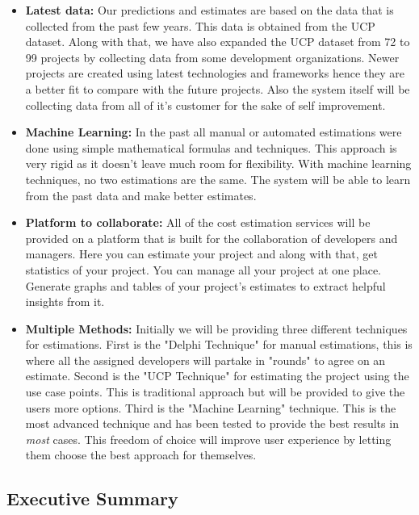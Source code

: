 \begin{itemize}
	\item {\bfseries Latest data:} Our predictions and estimates are based on the data that is collected from the past few years. This data is obtained from the UCP dataset. Along with that, we have also expanded the UCP dataset from 72 to 99 projects by collecting data from some development organizations. Newer projects are created using latest technologies and frameworks hence they are a better fit to compare with the future projects. Also the system itself will be collecting data from all of it's customer for the sake of self improvement.
	
	
	\item {\bfseries Machine Learning:} In the past all manual or automated estimations were done using simple mathematical formulas and techniques. This approach is very rigid as it doesn't leave much room for flexibility. With machine learning techniques, no two estimations are the same. The system will be able to learn from the past data and make better estimates.
	

	\item {\bfseries Platform to collaborate:} All of the cost estimation services will be provided on a platform that is built for the collaboration of developers and managers. Here you can estimate your project and along with that, get statistics of your project. You can manage all your project at one place. Generate graphs and tables of your project's estimates to extract helpful insights from it.
	

	\item {\bfseries Multiple Methods:} Initially we will be providing three different techniques for estimations. First is the "Delphi Technique" for manual estimations, this is where all the assigned developers will partake in "rounds" to agree on an estimate. Second is the "UCP Technique" for estimating the project using the use case points. This is traditional approach but will be provided to give the users more options. Third is the "Machine Learning" technique. This is the most advanced technique and has been tested to provide the best results in {\it{most}} cases. This freedom of choice will improve user experience by letting them choose the best approach for themselves.
\end{itemize}








\subsection{Executive Summary}
\blindtext


\blindtext

